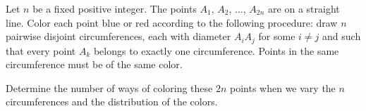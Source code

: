 Let $n$ be a fixed positive integer. The points $A_1$,  $A_2$,  $\ldots$,  $A_{2n}$ are on a straight line. Color each point blue or red according to the following procedure: draw $n$ pairwise disjoint circumferences, each with diameter $A_iA_j$ for some $i \neq j$ and such that every point $A_k$ belongs to exactly one circumference. Points in the same circumference must be of the same color.

Determine the number of ways of coloring these $2n$ points when we vary the $n$ circumferences and the distribution of the colors.